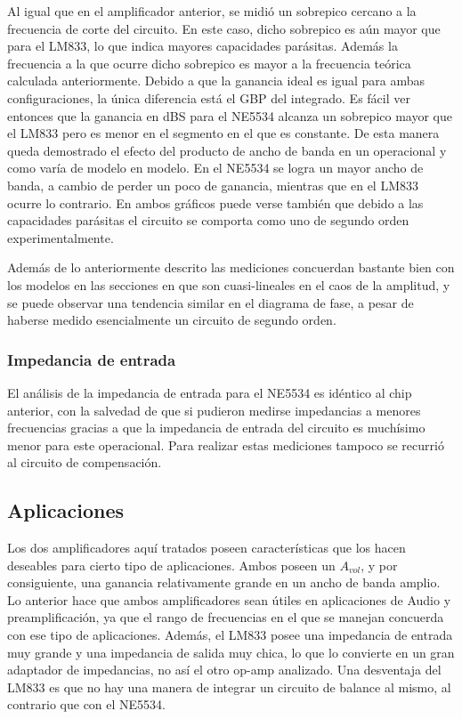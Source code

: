 Al igual que en el amplificador anterior, se midió un sobrepico cercano a la frecuencia de corte del circuito. En este caso, dicho sobrepico es aún mayor que para el LM833, lo que indica mayores capacidades parásitas. Además la frecuencia a la que ocurre dicho sobrepico es mayor a la frecuencia teórica calculada anteriormente. Debido a que la ganancia ideal es igual para ambas configuraciones, la única diferencia está el GBP del integrado. Es fácil ver entonces que la ganancia en dBS para el NE5534 alcanza un sobrepico mayor que el LM833 pero es menor en el segmento en el que es constante. De esta manera queda demostrado el efecto del producto de ancho de banda en un operacional y como varía de modelo en modelo. En el NE5534 se logra un mayor ancho de banda, a cambio de perder un poco de ganancia, mientras que en el LM833 ocurre lo contrario. En ambos gráficos puede verse también que debido a las capacidades parásitas el circuito se comporta como uno de segundo orden experimentalmente.

Además de lo anteriormente descrito las mediciones concuerdan bastante bien con los modelos en las secciones en que son cuasi-lineales en el caos de la amplitud, y se puede observar una tendencia similar en el diagrama de fase, a pesar de haberse medido esencialmente un circuito de segundo orden.

\subsubsection{Impedancia de entrada}
El análisis de la impedancia de entrada para el NE5534 es idéntico al chip anterior, con la salvedad de que si pudieron medirse impedancias a menores frecuencias gracias a que la impedancia de entrada del circuito es muchísimo menor para este operacional. Para realizar estas mediciones tampoco se recurrió al circuito de compensación.


\subsection{Aplicaciones}
Los dos amplificadores aquí tratados poseen características que los hacen deseables para cierto tipo de aplicaciones. Ambos poseen un $A_{vol}$, y por consiguiente, una ganancia relativamente grande en un ancho de banda amplio. Lo anterior hace que ambos amplificadores sean útiles en aplicaciones de Audio y preamplificación, ya que el rango de frecuencias en el que se manejan concuerda con ese tipo de aplicaciones. Además, el LM833 posee una impedancia de entrada muy grande y una impedancia de salida muy chica, lo que lo convierte en un gran adaptador de impedancias, no así el otro op-amp analizado. Una desventaja del LM833 es que no hay una manera de integrar un circuito de balance al mismo, al contrario que con el NE5534. 


